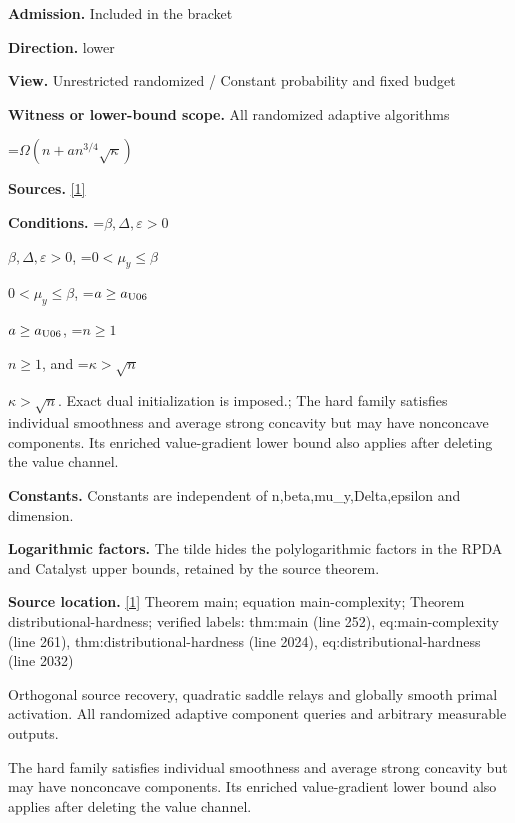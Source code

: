 \documentclass[10pt,a4paper]{article}
\newcommand{\AtlasMath}[1]{\par\begingroup\centering\setbox0=\hbox{$\displaystyle #1$}\ifdim\wd0>1.4\linewidth\typeout{ATLAS WIDE FORMULA: \the\wd0}\fi\ifdim\wd0>\linewidth\resizebox{\linewidth}{!}{\box0}\else\box0\fi\par\endgroup}
\newcommand{\AtlasInlineMath}[1]{\begingroup\setbox0=\hbox{$#1$}\ifdim\wd0>.4\linewidth\endgroup\AtlasMath{#1}\else\endgroup$#1$\fi}
\begin{document}
\textbf{Admission.} Included in the bracket



\textbf{Direction.} lower



\textbf{View.} Unrestricted randomized / Constant probability and fixed budget



\textbf{Witness or lower-bound scope.} All randomized adaptive algorithms



\AtlasMath{\Omega(n+a n^{3/4}\sqrt\kappa)}


\textbf{Sources.} \href{https://github.com/WU-Wendao/Colombo/blob/main/colombo_sensorium/Complexity_altas/data/sources/colombo/U06/manuscript.pdf}{[1]}



\textbf{Conditions.} \AtlasInlineMath{\beta,\Delta,\varepsilon>0}, \AtlasInlineMath{0<\mu_y\le\beta}, \AtlasInlineMath{a\ge a_{\rm U06}}, \AtlasInlineMath{n\ge1}, and \AtlasInlineMath{\kappa>\sqrt n}. Exact dual initialization is imposed.; The hard family satisfies individual smoothness and average strong concavity but may have nonconcave components. Its enriched value-gradient lower bound also applies after deleting the value channel.



\textbf{Constants.} Constants are independent of n,beta,mu\_y,Delta,epsilon and dimension.



\textbf{Logarithmic factors.} The tilde hides the polylogarithmic factors in the RPDA and Catalyst upper bounds, retained by the source theorem.



\textbf{Source location.} \href{https://github.com/WU-Wendao/Colombo/blob/main/colombo_sensorium/Complexity_altas/data/sources/colombo/U06/manuscript.pdf}{[1]} Theorem main; equation main-complexity; Theorem distributional-hardness; verified labels: thm:main (line 252), eq:main-complexity (line 261), thm:distributional-hardness (line 2024), eq:distributional-hardness (line 2032)



Orthogonal source recovery, quadratic saddle relays and globally smooth primal activation. All randomized adaptive component queries and arbitrary measurable outputs.



The hard family satisfies individual smoothness and average strong concavity but may have nonconcave components. Its enriched value-gradient lower bound also applies after deleting the value channel.
\end{document}
